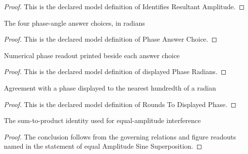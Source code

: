 \begin{proof}
  This is the declared model definition of Identifies Resultant Amplitude.
\end{proof}
\begin{definition}
  \label{def:physics:phyx-mini-0294:phyxminiproblems-problemphyxmini0294-phaseanswerchoice}
  The four phase-angle answer choices, in radians
\end{definition}
\begin{proof}
  This is the declared model definition of Phase Answer Choice.
\end{proof}
\begin{definition}
  \label{def:physics:phyx-mini-0294:phyxminiproblems-problemphyxmini0294-displayedphaseradians}
  Numerical phase readout printed beside each answer choice
\end{definition}
\begin{proof}
  This is the declared model definition of displayed Phase Radians.
\end{proof}
\begin{definition}
  \label{def:physics:phyx-mini-0294:phyxminiproblems-problemphyxmini0294-roundstodisplayedphase}
  Agreement with a phase displayed to the nearest hundredth of a radian
\end{definition}
\begin{proof}
  This is the declared model definition of Rounds To Displayed Phase.
\end{proof}
\begin{lemma}
  \label{lem:physics:phyx-mini-0294:phyxminiproblems-problemphyxmini0294-equalamplitudesinesuperposition}
  The sum-to-product identity used for equal-amplitude interference
\end{lemma}
\begin{proof}
  The conclusion follows from the governing relations and figure readouts named in the statement of equal Amplitude Sine Superposition.
\end{proof}
